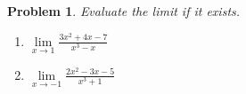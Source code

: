 \documentclass{article}
\newtheorem{problem}{Problem}
\begin{document}
\begin{comment}\textbf{Solution.} 

\noindent (1) Set $\cos x=u$. Then 
\[
2\cos^2 x- (1+\sqrt{2})\cos x+\frac{\sqrt 2}2=0 
\] 
becomes 
\[2u^2-(1+\sqrt{2})u+\frac{\sqrt{2}}{2}=0.
\] 
This is a quadratic equation in $u$ and therefore has solutions
\[
\begin{array}{rcl}
u_1, u_2&=& \displaystyle \frac{ 1+\sqrt{2}\pm\sqrt{ (1+\sqrt{2})^2-4 \sqrt{2} } }4\\
&=&\frac{1+\sqrt{2}\pm\sqrt{1-2\sqrt{2}+2} }4\\
&=&\frac{1+\sqrt{2}\pm \sqrt{(1-\sqrt{2})^2}}4\\
&=&\frac{1+\sqrt{2}\pm (1-\sqrt{2}) }4=\doublebrace{\frac{1}2 }{ \mathrm{or}} {\frac{\sqrt{2}}{2}}{}
\end{array}
\]
Therefore $u=\cos x= \frac12$ or $u=\cos x=\frac{\sqrt{2}}2$, and, as $x$ is in the interval $[0,2\pi]$, we get $x=\frac{\pi}{3}, \frac{5\pi}{3}$ (for $\cos x=\frac12$) or $x=\frac{\pi }4 ,\frac{7\pi}4$ (for $\cos x=\frac{\sqrt{2}}{2}$).
\end{comment}
\begin{problem}
Evaluate the limit if it exists.
\begin{enumerate}
\item $\lim\limits_{x\to 1} \frac{3x^2+4x-7}{x^3-x}$ 
\item $\lim\limits_{x\to -1} \frac{2x^2-3x-5}{x^3+1}$ 
\end{enumerate}
\end{problem}
\end{document}
